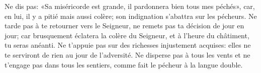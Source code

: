 Ne dis pas: «Sa miséricorde est grande, il pardonnera bien tous mes péchés»,
	car, en lui, il y a pitié mais aussi colère;
	son indignation s’abattra sur les pécheurs.
Ne tarde pas à te retourner vers le Seigneur,
	ne remets pas ta décision de jour en jour;
	car brusquement éclatera la colère du Seigneur,
	et à l’heure du châtiment, tu seras anéanti.
Ne t’appuie pas sur des richesses injustement acquises:
	elles ne te serviront de rien au jour de l’adversité.
Ne disperse pas à tous les vents et ne t’engage pas dans tous les sentiers,
	comme fait le pécheur à la langue double.
